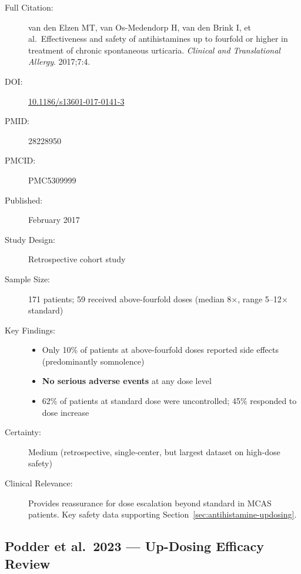 \begin{description}
    \item[Full Citation:] van den Elzen MT, van Os-Medendorp H, van den Brink I, et al.\ Effectiveness and safety of antihistamines up to fourfold or higher in treatment of chronic spontaneous urticaria. \textit{Clinical and Translational Allergy}. 2017;7:4.
    \item[DOI:] \href{https://doi.org/10.1186/s13601-017-0141-3}{10.1186/s13601-017-0141-3}
    \item[PMID:] 28228950
    \item[PMCID:] PMC5309999
    \item[Published:] February 2017
    \item[Study Design:] Retrospective cohort study
    \item[Sample Size:] 171 patients; 59 received above-fourfold doses (median 8$\times$, range 5--12$\times$ standard)
    \item[Key Findings:]
    \begin{itemize}
        \item Only 10\% of patients at above-fourfold doses reported side effects (predominantly somnolence)
        \item \textbf{No serious adverse events} at any dose level
        \item 62\% of patients at standard dose were uncontrolled; 45\% responded to dose increase
    \end{itemize}
    \item[Certainty:] Medium (retrospective, single-center, but largest dataset on high-dose safety)
    \item[Clinical Relevance:] Provides reassurance for dose escalation beyond standard in MCAS patients. Key safety data supporting Section~\ref{sec:antihistamine-updosing}.
\end{description}

\subsection{Podder et al.\ 2023 --- Up-Dosing Efficacy Review}

